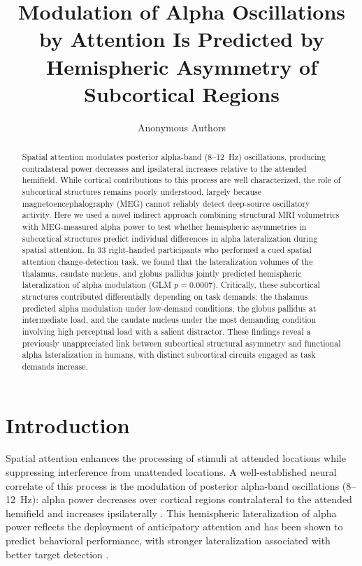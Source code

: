 \documentclass[12pt]{article}
\title{Modulation of Alpha Oscillations by Attention Is Predicted by Hemispheric Asymmetry of Subcortical Regions}
\author{Anonymous Authors}
\date{}
\begin{document}
\maketitle

\begin{abstract}
Spatial attention modulates posterior alpha-band (8--12~Hz) oscillations, producing contralateral power decreases and ipsilateral increases relative to the attended hemifield. While cortical contributions to this process are well characterized, the role of subcortical structures remains poorly understood, largely because magnetoencephalography (MEG) cannot reliably detect deep-source oscillatory activity. Here we used a novel indirect approach combining structural MRI volumetrics with MEG-measured alpha power to test whether hemispheric asymmetries in subcortical structures predict individual differences in alpha lateralization during spatial attention. In 33 right-handed participants who performed a cued spatial attention change-detection task, we found that the lateralization volumes of the thalamus, caudate nucleus, and globus pallidus jointly predicted hemispheric lateralization of alpha modulation (GLM $p = 0.0007$). Critically, these subcortical structures contributed differentially depending on task demands: the thalamus predicted alpha modulation under low-demand conditions, the globus pallidus at intermediate load, and the caudate nucleus under the most demanding condition involving high perceptual load with a salient distractor. These findings reveal a previously unappreciated link between subcortical structural asymmetry and functional alpha lateralization in humans, with distinct subcortical circuits engaged as task demands increase.
\end{abstract}

\section{Introduction}

Spatial attention enhances the processing of stimuli at attended locations while suppressing interference from unattended locations. A well-established neural correlate of this process is the modulation of posterior alpha-band oscillations (8--12~Hz): alpha power decreases over cortical regions contralateral to the attended hemifield and increases ipsilaterally \citep{worden2000anticipatory, thut2006alpha, klimesch2007eeg}. This hemispheric lateralization of alpha power reflects the deployment of anticipatory attention and has been shown to predict behavioral performance, with stronger lateralization associated with better target detection \citep{thut2006alpha}.
\end{document}
